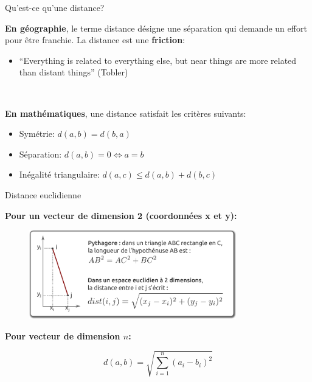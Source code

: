 \begin{frame}{Qu'est-ce qu'une distance?}


\textbf{En géographie}, le terme distance désigne une séparation qui demande un effort pour être franchie. La distance est une \textbf{friction}:

\begin{itemize}
  \item ``Everything is related to everything else, but near things are more related than distant things'' (Tobler)
\end{itemize}

~ 

\textbf{En mathématiques}, une distance satisfait les critères suivants:

\begin{itemize}
  \item Symétrie: $d(a, b) = d(b,a)$
  \item Séparation: $d(a, b) = 0 \Longleftrightarrow a = b$
  \item Inégalité triangulaire: $d(a,c) \leq d(a,b) + d(b,c)$
\end{itemize}

\end{frame}


\begin{frame}{Distance euclidienne}

\textbf{Pour un vecteur de dimension 2 (coordonnées x et y):}

\begin{figure}
  \includegraphics[width=9cm]{DistancesEucli.pdf}
\end{figure}

\textbf{Pour vecteur de dimension $n$:}

\begin{equation}
  \nonumber
  d(a,b) = \sqrt{\sum_{i=1}^n (a_i - b_i)^2}
\end{equation}

\end{frame}


